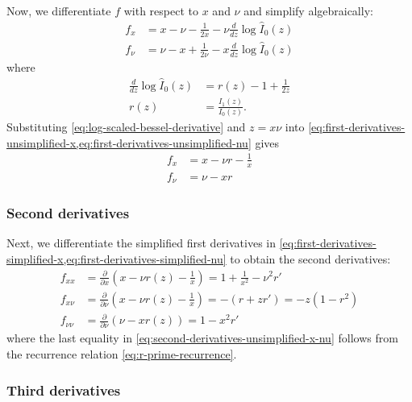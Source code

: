 \documentclass{article}
\begin{document}
Now, we differentiate $f$ with respect to $x$ and $\nu$ and simplify algebraically:
%
\begin{align}
  f_x   & = x-\nu -\frac{1}{2x} - \nu\frac{d}{dz}\log\hat{I}_0(z) \label{eq:first-derivatives-unsimplified-x}  \\
  f_\nu & = \nu-x +\frac{1}{2\nu} - x\frac{d}{dz}\log\hat{I}_0(z) \label{eq:first-derivatives-unsimplified-nu}
\end{align}
%
where
%
\begin{align}
  \frac{d}{dz}\log\hat{I}_0(z) & = r(z) - 1 + \frac{1}{2z} \label{eq:log-scaled-bessel-derivative} \\
  r(z)                         & = \frac{I_1(z)}{I_0(z)}. \label{eq:ratio-r}
\end{align}
%
Substituting \cref{eq:log-scaled-bessel-derivative} and $z=x\nu$ into \cref{eq:first-derivatives-unsimplified-x,eq:first-derivatives-unsimplified-nu} gives
%
\begin{align}
  f_x   & = x - \nu r - \frac{1}{x} \label{eq:first-derivatives-simplified-x} \\
  f_\nu & = \nu - x r \label{eq:first-derivatives-simplified-nu}
\end{align}

\subsubsection{Second derivatives}

Next, we differentiate the simplified first derivatives in \cref{eq:first-derivatives-simplified-x,eq:first-derivatives-simplified-nu} to obtain the second derivatives:
%
\begin{align}
  f_{xx}     & = \frac{\partial}{\partial x}\left(x - \nu r(z) - \frac{1}{x}\right) = 1 + \frac{1}{x^2} - \nu^2 r' \label{eq:second-derivatives-unsimplified-x-x} \\
  f_{x\nu}   & = \frac{\partial}{\partial \nu}\left(x - \nu r(z) - \frac{1}{x}\right) = -(r + z r') = -z(1 - r^2) \label{eq:second-derivatives-unsimplified-x-nu} \\
  f_{\nu\nu} & = \frac{\partial}{\partial \nu}\left(\nu - x r(z)\right) = 1 - x^2 r' \label{eq:second-derivatives-unsimplified-nu-nu}
\end{align}
%
where the last equality in \cref{eq:second-derivatives-unsimplified-x-nu} follows from the recurrence relation \cref{eq:r-prime-recurrence}.

\subsubsection{Third derivatives}
\end{document}
